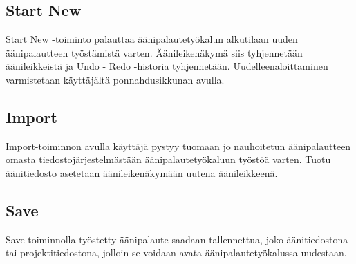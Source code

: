 \documentclass[utf8]{gradu3}
\begin{document}
\subsection{Start New}

Start New -toiminto palauttaa äänipalautetyökalun alkutilaan uuden äänipalautteen työstämistä varten. Äänileikenäkymä siis tyhjennetään äänileikkeistä ja Undo - Redo -historia tyhjennetään. Uudelleenaloittaminen varmistetaan käyttäjältä ponnahdusikkunan avulla.

\subsection{Import}

Import-toiminnon avulla käyttäjä pystyy tuomaan jo nauhoitetun äänipalautteen omasta tiedostojärjestelmästään äänipalautetyökaluun työstöä varten. Tuotu äänitiedosto asetetaan äänileikenäkymään uutena äänileikkeenä. 

\subsection{Save}

Save-toiminnolla työstetty äänipalaute saadaan tallennettua, joko äänitiedostona tai projektitiedostona, jolloin se voidaan avata äänipalautetyökalussa uudestaan.
\end{document}
